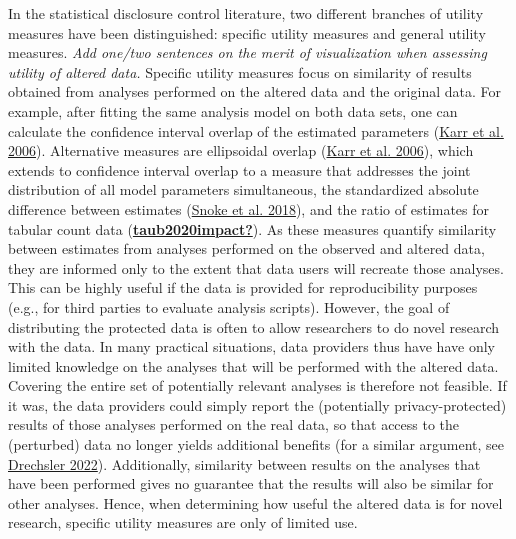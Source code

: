 \documentclass[
]{article}
\begin{document}
In the statistical disclosure control literature, two different branches
of utility measures have been distinguished: specific utility measures
and general utility measures. \emph{Add one/two sentences on the merit
of visualization when assessing utility of altered data.} Specific
utility measures focus on similarity of results obtained from analyses
performed on the altered data and the original data. For example, after
fitting the same analysis model on both data sets, one can calculate the
confidence interval overlap of the estimated parameters
(\protect\hyperlink{ref-karr_utility_2006}{Karr et al. 2006}).
Alternative measures are ellipsoidal overlap
(\protect\hyperlink{ref-karr_utility_2006}{Karr et al. 2006}), which
extends to confidence interval overlap to a measure that addresses the
joint distribution of all model parameters simultaneous, the
standardized absolute difference between estimates
(\protect\hyperlink{ref-snoke_utility_2018}{Snoke et al. 2018}), and the
ratio of estimates for tabular count data
(\protect\hyperlink{ref-taub2020impact}{\textbf{taub2020impact?}}). As
these measures quantify similarity between estimates from analyses
performed on the observed and altered data, they are informed only to
the extent that data users will recreate those analyses. This can be
highly useful if the data is provided for reproducibility purposes
(e.g., for third parties to evaluate analysis scripts). However, the
goal of distributing the protected data is often to allow researchers to
do novel research with the data. In many practical situations, data
providers thus have have only limited knowledge on the analyses that
will be performed with the altered data. Covering the entire set of
potentially relevant analyses is therefore not feasible. If it was, the
data providers could simply report the (potentially privacy-protected)
results of those analyses performed on the real data, so that access to
the (perturbed) data no longer yields additional benefits (for a similar
argument, see \protect\hyperlink{ref-drechsler_utility_2022}{Drechsler
2022}). Additionally, similarity between results on the analyses that
have been performed gives no guarantee that the results will also be
similar for other analyses. Hence, when determining how useful the
altered data is for novel research, specific utility measures are only
of limited use.
\end{document}
